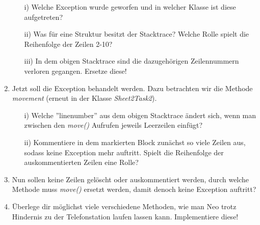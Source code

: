 \begin{enumerate}[label=\alph*)]
\begin{enumerate}
        \item[i)] Welche Exception wurde geworfen und in welcher Klasse ist diese aufgetreten?
        \item[ii)] Was für eine Struktur besitzt der Stacktrace? Welche Rolle spielt die Reihenfolge der Zeilen 2-10? 
        \item[iii)] In dem obigen Stacktrace sind die dazugehörigen Zeilennummern verloren gegangen. Ersetze diese!  
    \end{enumerate}
    \item Jetzt soll die Exception behandelt werden. Dazu betrachten wir die Methode \textit{movement} (erneut in der Klasse 
    \textit{Sheet2Task2}).
    \begin{enumerate}
        \item[i)] Welche ''linenumber'' aus dem obigen Stacktrace ändert sich, wenn man zwischen den \textit{move()} Aufrufen jeweils
        Leerzeilen einfügt?  
        \item[ii)] Kommentiere in dem markierten Block zunächst so viele Zeilen aus, sodass keine Exception mehr auftritt. 
        Spielt die Reihenfolge der auskommentierten Zeilen eine Rolle?
    \end{enumerate}
    \item  Nun sollen keine Zeilen gelöscht oder auskommentiert werden, durch welche Methode muss \textit{move()} ersetzt werden, damit 
    denoch keine Exception auftritt?
    \item Überlege dir möglichst viele verschiedene Methoden, wie man Neo trotz Hindernis zu der Telefonstation laufen lassen kann. 
    Implementiere diese!
\end{enumerate}
 
